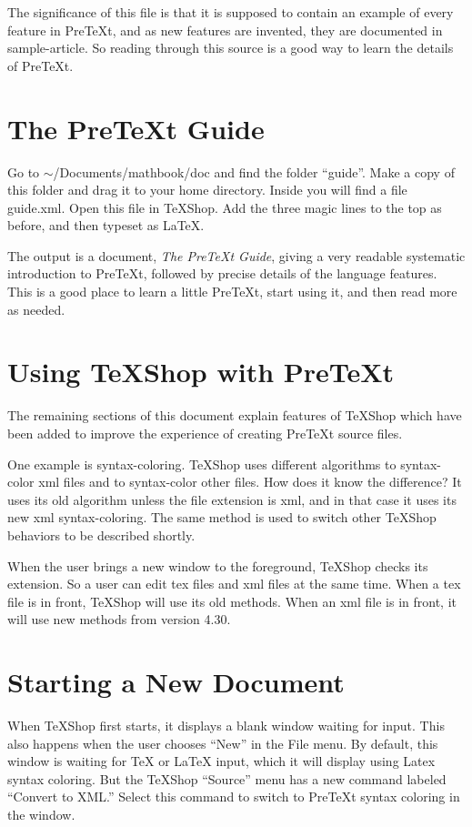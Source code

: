 \documentclass[11pt, oneside]{article}   	%
\begin{document}
The significance of this file is that it is supposed to contain an example of every feature in PreTeXt, and as new features are invented, they are documented in sample-article. So reading through this source is a good way to learn the details of PreTeXt.

\section{The PreTeXt Guide}

Go to $\sim$/Documents/mathbook/doc and find the folder ``guide''. Make a copy of this folder and drag it to your home directory. Inside you will find a file guide.xml. Open this file in TeXShop. Add the three magic lines to the top as before, and then typeset as LaTeX.

The output is a  document, {\em The PreTeXt Guide}, giving a very readable systematic introduction to PreTeXt, followed by precise details of the language features. This is a good place to learn a little PreTeXt, start using it, and then read more as needed.


\section{Using TeXShop with PreTeXt}

The remaining sections of this document explain features of TeXShop which have been added to improve the experience of creating PreTeXt source files. 

One example is syntax-coloring. TeXShop uses different algorithms to syntax-color xml files and to syntax-color other files. How does it know the difference? It uses its old algorithm unless the file extension is xml, and in that case it uses its new xml syntax-coloring. The same method is used to switch  other TeXShop behaviors to be described shortly.

When the user brings a new window to the foreground, TeXShop checks its extension. So a user can edit tex files and xml files at the same time. When a tex file is in front, TeXShop will use its old methods. When an xml file is in front, it will use new methods from version 4.30.

\section{Starting a New Document}

When TeXShop first starts, it  displays a blank window waiting for input. This also happens when the user chooses ``New'' in the File menu. By default, this window is waiting for TeX or LaTeX input, which it will display using Latex syntax coloring. But the TeXShop ``Source'' menu has a new command labeled ``Convert to XML.'' Select this command to switch to PreTeXt syntax coloring in the window. 
\end{document}

